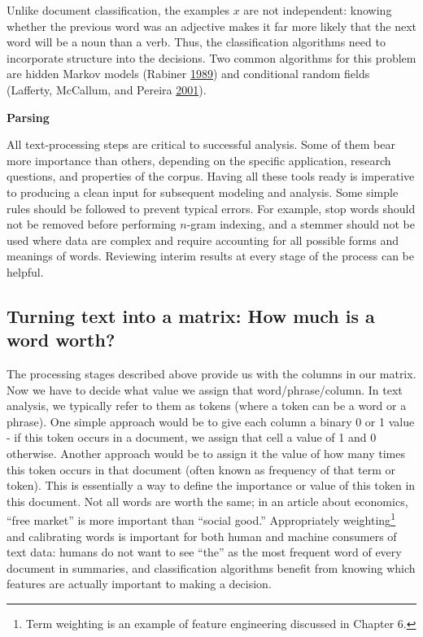 \documentclass[]{krantz}
\begin{document}
Unlike document classification, the examples \(x\) are not independent:
knowing whether the previous word was an adjective makes it far more
likely that the next word will be a noun than a verb. Thus, the
classification algorithms need to incorporate structure into the
decisions. Two common algorithms for this problem are hidden Markov
models (Rabiner \protect\hyperlink{ref-rabiner-89}{1989}) and
conditional random fields (Lafferty, McCallum, and Pereira
\protect\hyperlink{ref-lafferty-01}{2001}).

\vspace*{-2pt} \textbf{Parsing}

All text-processing steps are critical to successful analysis. Some of
them bear more importance than others, depending on the specific
application, research questions, and properties of the corpus. Having
all these tools ready is imperative to producing a clean input for
subsequent modeling and analysis. Some simple rules should be followed
to prevent typical errors. For example, stop words should not be removed
before performing \(n\)-gram indexing, and a stemmer should not be used
where data are complex and require accounting for all possible forms and
meanings of words. Reviewing interim results at every stage of the
process can be helpful.

\subsection{Turning text into a matrix: How much is a word
worth?}\label{turning-text-into-a-matrix-how-much-is-a-word-worth}

The processing stages described above provide us with the columns in our
matrix. Now we have to decide what value we assign that
word/phrase/column. In text analysis, we typically refer to them as
tokens (where a token can be a word or a phrase). One simple approach
would be to give each column a binary 0 or 1 value - if this token
occurs in a document, we assign that cell a value of 1 and 0 otherwise.
Another approach would be to assign it the value of how many times this
token occurs in that document (often known as frequency of that term or
token). This is essentially a way to define the importance or value of
this token in this document. Not all words are worth the same; in an
article about economics, ``free market'' is more important than ``social
good.'' Appropriately weighting\footnote{Term weighting is an example of
  feature engineering discussed in Chapter 6.} and calibrating words is
important for both human and machine consumers of text data: humans do
not want to see ``the'' as the most frequent word of every document in
summaries, and classification algorithms benefit from knowing which
features are actually important to making a decision.
\end{document}
